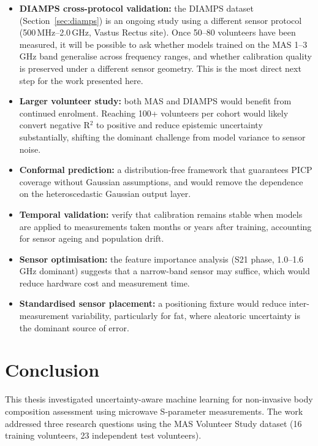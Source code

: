 \documentclass[12pt, a4paper, oneside]{report}
\begin{document}
\begin{itemize}[noitemsep]
  \item \textbf{DIAMPS cross-protocol validation:} the DIAMPS dataset (Section~\ref{sec:diamps}) is an ongoing study using a different sensor protocol (500\,MHz--2.0\,GHz, Vastus Rectus site). Once 50--80 volunteers have been measured, it will be possible to ask whether models trained on the MAS 1--3\,GHz band generalise across frequency ranges, and whether calibration quality is preserved under a different sensor geometry. This is the most direct next step for the work presented here.
  \item \textbf{Larger volunteer study:} both MAS and DIAMPS would benefit from continued enrolment. Reaching 100+ volunteers per cohort would likely convert negative R$^2$ to positive and reduce epistemic uncertainty substantially, shifting the dominant challenge from model variance to sensor noise.
  \item \textbf{Conformal prediction:} a distribution-free framework that guarantees PICP coverage without Gaussian assumptions, and would remove the dependence on the heteroscedastic Gaussian output layer.
  \item \textbf{Temporal validation:} verify that calibration remains stable when models are applied to measurements taken months or years after training, accounting for sensor ageing and population drift.
  \item \textbf{Sensor optimisation:} the feature importance analysis (S21 phase, 1.0--1.6\,GHz dominant) suggests that a narrow-band sensor may suffice, which would reduce hardware cost and measurement time.
  \item \textbf{Standardised sensor placement:} a positioning fixture would reduce inter-measurement variability, particularly for fat, where aleatoric uncertainty is the dominant source of error.
\end{itemize}

\chapter{Conclusion}
\label{ch:conclusion}

This thesis investigated uncertainty-aware machine learning for non-invasive body composition assessment using microwave S-parameter measurements. The work addressed three research questions using the MAS Volunteer Study dataset (16 training volunteers, 23 independent test volunteers).
\end{document}
